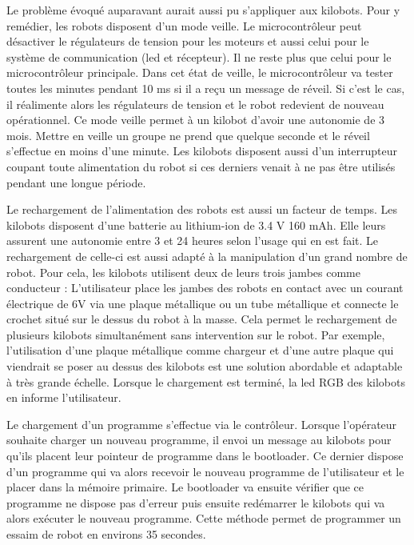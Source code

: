 \documentclass[a4paper,8pt]{report}
\begin{document}
\smallskip
Le probl\`eme \'evoqu\'e auparavant aurait aussi pu s'appliquer aux kilobots. Pour y rem\'edier, les robots disposent d'un mode veille. Le microcontr\^oleur peut d\'esactiver le r\'egulateurs de tension pour les moteurs et aussi celui pour le syst\`eme de communication (led et r\'ecepteur). Il ne reste plus que celui pour le microcontr\^oleur principale. Dans cet \'etat de veille, le microcontr\^oleur va tester toutes les minutes pendant 10 ms si il a reçu un message de r\'eveil. Si c'est le cas, il r\'ealimente alors les r\'egulateurs de tension et le robot redevient de nouveau op\'erationnel. Ce mode veille permet \`a un kilobot d'avoir une autonomie de 3 mois. Mettre en veille un groupe ne prend que quelque seconde et le r\'eveil s'effectue en moins d'une minute. Les kilobots disposent aussi d'un interrupteur coupant toute alimentation du robot si ces derniers venait \`a ne pas \^etre utilis\'es pendant une longue p\'eriode.

\smallskip
Le rechargement de l'alimentation des robots est aussi un facteur de temps. Les kilobots disposent d'une batterie au lithium-ion de 3.4 V 160 mAh. Elle leurs assurent une autonomie entre 3 et 24 heures selon l'usage qui en est fait. Le rechargement de celle-ci est aussi adapt\'e \`a la manipulation d'un grand nombre de robot. Pour cela, les kilobots utilisent deux de leurs trois jambes comme conducteur : L'utilisateur place les jambes des robots en contact avec un courant \'electrique de 6V via une plaque m\'etallique ou un tube m\'etallique et connecte le crochet situ\'e sur le dessus du robot \`a la masse. Cela permet le rechargement de plusieurs kilobots simultan\'ement sans intervention sur le robot. Par exemple, l'utilisation d'une plaque m\'etallique comme chargeur et d'une autre plaque qui viendrait se poser au dessus des kilobots est une solution abordable et adaptable \`a tr\`es grande \'echelle. Lorsque le chargement est termin\'e, la led RGB des kilobots en informe l'utilisateur.

\smallskip
Le chargement d'un programme s'effectue via le contr\^oleur. Lorsque l'op\'erateur souhaite charger un nouveau programme, il envoi un message au kilobots pour qu'ils placent leur pointeur de programme dans le bootloader. Ce dernier dispose d'un programme qui va alors recevoir le nouveau programme de l'utilisateur et le placer dans la m\'emoire primaire. Le bootloader va ensuite v\'erifier que ce programme ne dispose pas d'erreur puis ensuite red\'emarrer le kilobots qui va alors ex\'ecuter le nouveau programme. Cette m\'ethode permet de programmer un essaim de robot en environs 35 secondes. 
\end{document}
